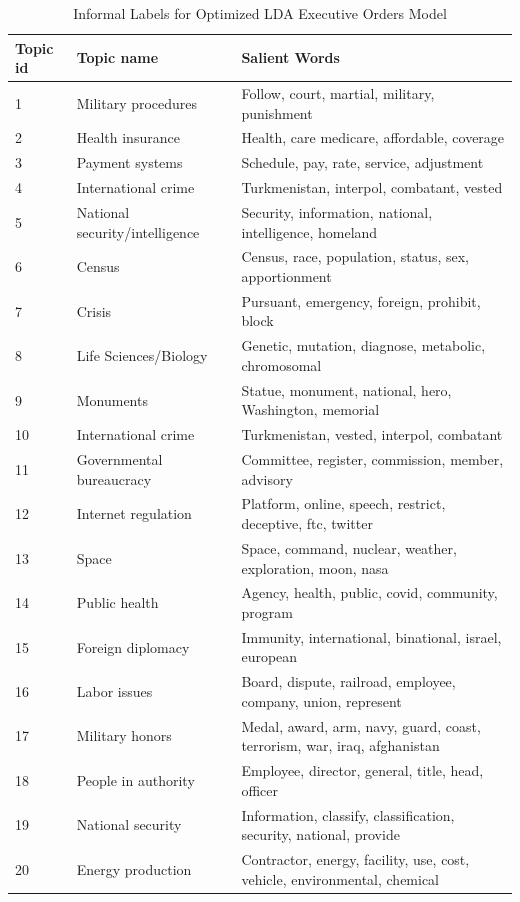 \documentclass{article}
\begin{document}
{{\begin{table}[H]
	\caption{Informal Labels for Optimized LDA Executive Orders Model}
	\centering
	\begin{tabular}{lll}
		\toprule
		\midrule
		Topic id  & Topic name & Salient Words \\
		\midrule
		\midrule
		1 & Military procedures & Follow, court, martial, military, punishment \\
		\midrule
		2 & Health insurance & Health, care medicare, affordable, coverage \\
		\midrule
		3 & Payment systems & Schedule, pay, rate, service, adjustment \\
		\midrule
		4 & International crime & Turkmenistan, interpol, combatant, vested  \\
		\midrule
		5 & National security/intelligence & Security, information, national, intelligence, homeland \\
		\midrule
		6 & Census & Census, race, population, status, sex, apportionment\\
		\midrule
		7 & Crisis & Pursuant, emergency, foreign, prohibit, block\\
		\midrule
		8 & Life Sciences/Biology & Genetic, mutation, diagnose, metabolic, chromosomal\\
		\midrule
		9 & Monuments & Statue, monument, national, hero, Washington, memorial\\
		\midrule
		10 & International crime & Turkmenistan, vested, interpol, combatant\\
		\midrule
		11 & Governmental bureaucracy & Committee, register, commission, member, advisory\\
		\midrule
		12 & Internet regulation & Platform, online, speech, restrict, deceptive, ftc, twitter\\
		\midrule
		13 & Space & Space, command, nuclear, weather, exploration, moon, nasa\\
		\midrule
		14 & Public health & Agency, health, public, covid, community, program\\
		\midrule
		15 & Foreign diplomacy & Immunity, international, binational, israel, european\\
		\midrule
		16 & Labor issues & Board, dispute, railroad, employee, company, union, represent\\
		\midrule
		17 & Military honors & Medal, award, arm, navy, guard, coast, terrorism, war, iraq, afghanistan\\
		\midrule
		18 & People in authority & Employee, director, general, title, head, officer\\
		\midrule
		19 & National security & Information, classify, classification, security, national, provide\\
		\midrule
		20 & Energy production & Contractor, energy, facility, use, cost, vehicle, environmental, chemical\\
		\bottomrule
	\end{tabular}
\end{table}

}}
\end{document}
